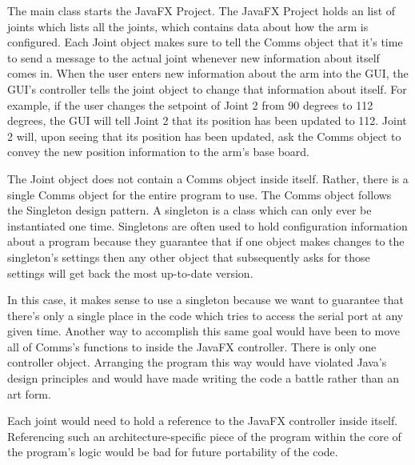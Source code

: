 \noindent The main class starts the JavaFX Project. The JavaFX Project holds an list of joints which lists all the joints, which contains data about how the arm is configured. Each Joint object makes sure to tell the Comms object that it's time to send a message to the actual joint whenever new information about itself comes in. When the user enters new information about the arm into the GUI, the GUI's controller tells the joint object to change that information about itself. For example, if the user changes the setpoint of Joint 2 from 90 degrees to 112 degrees, the GUI will tell Joint 2 that its position has been updated to 112. Joint 2 will, upon seeing that its position has been updated, ask the Comms object to convey the new position information to the arm's base board.

\noindent The Joint object does not contain a Comms object inside itself. Rather, there is a single Comms object for the entire program to use. The Comms object follows the Singleton design pattern. A singleton is a class which can only ever be instantiated one time. Singletons are often used to hold configuration information about a program because they guarantee that if one object makes changes to the singleton's settings then any other object that subsequently asks for those settings will get back the most up-to-date version.

\noindent In this case, it makes sense to use a singleton because we want to guarantee that there's only a single place in the code which tries to access the serial port at any given time. Another way to accomplish this same goal would have been to move all of Comms's functions to inside the JavaFX controller. There is only one controller object. Arranging the program this way would have violated Java's design principles and would have made writing the code a battle rather than an art form. %

\noindent Each joint would need to hold a reference to the JavaFX controller inside itself. Referencing such an architecture-specific piece of the program within the core of the program's logic would be bad for future portability of the code. 

